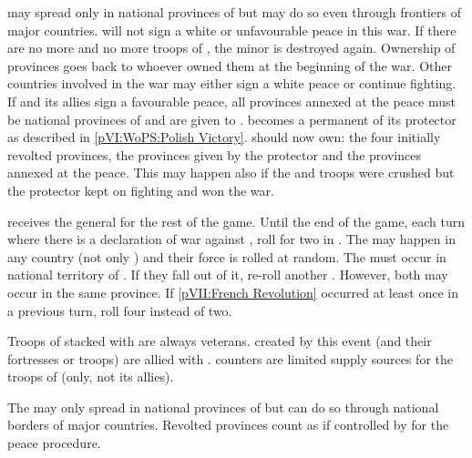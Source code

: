 \phpaix
\aparag \REVOLT may spread only in national provinces of \POL but may do so
even through frontiers of major countries.
\aparag \payspologne will not sign a white or unfavourable peace in this war.
\aparag If there are no more \REVOLT and no more troops of \payspologne, the
minor is destroyed again.
\bparag Ownership of provinces goes back to whoever owned them at the
beginning of the war.
\bparag Other countries involved in the war may either sign a white peace or
continue fighting.
\aparag If \payspologne and its allies sign a favourable peace, all provinces
annexed at the peace must be national provinces of \POL and are given to
\payspologne.
\bparag \payspologne becomes a permanent \EG of its protector as described in
\ref{pVI:WoPS:Polish Victory}.
\bparag \payspologne should now own: the four initially revolted provinces,
the provinces given by the protector and the provinces annexed at the peace.
\bparag This may happen also if the \REVOLT and troops were crushed but the
protector kept on fighting and won the war.



\phadm
\aparag \payspologne receives the general  for the
rest of the game.
\aparag Until the end of the game, each turn where there is a declaration of
war against \payspologne, roll for two \REVOLT in \POL.
\bparag The \REVOLT may happen in any country (not only \payspologne) and
their force is rolled at random.
\bparag The \REVOLT must occur in national territory of \POL. If they fall out
of it, re-roll another \REVOLT . However, both \REVOLT may occur in the same
province.
\bparag If \ref{pVII:French Revolution} occurred at least once in a previous
turn, roll four \REVOLT instead of two.

\phmil
\aparag Troops of \payspologne stacked with \leaderKosciuszko are always
veterans.
\aparag \REVOLT created by this event (and their fortresses or troops) are
allied with \payspologne.
\bparag \REVOLT counters are limited supply sources for the troops of
\payspologne (only, not its allies).

\phpaix
\aparag The \REVOLT may only spread in national provinces of \POL but can do
so through national borders of major countries.
\aparag Revolted provinces count as if controlled by \payspologne for the
peace procedure.



